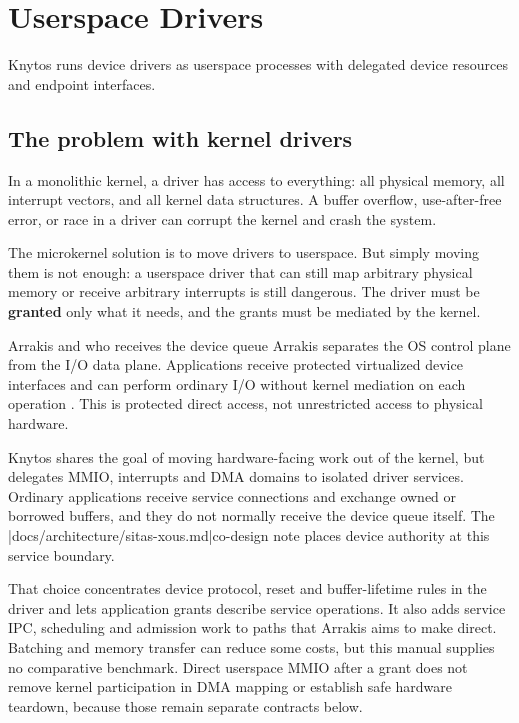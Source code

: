 \chapter{Userspace Drivers}
\label{chap:userspace-drivers}

Knytos runs device drivers as userspace processes with delegated device
resources and endpoint interfaces.

\section{The problem with kernel drivers}

In a monolithic kernel, a driver has access to everything: all physical memory,
all interrupt vectors, and all kernel data structures. A buffer overflow,
use-after-free error, or race in a driver can corrupt the kernel and crash the
system.

The microkernel solution is to move drivers to userspace. But simply moving
them is not enough: a userspace driver that can still map arbitrary physical
memory or receive arbitrary interrupts is still dangerous. The driver must be
\textbf{granted} only what it needs, and the grants must be mediated by the
kernel.

\begin{architecturalcomparison}{Arrakis and who receives the device queue}
Arrakis separates the OS control plane from the I/O data plane. Applications
receive protected virtualized device interfaces and can perform ordinary I/O
without kernel mediation on each operation \cite{prior:arrakis}. This is
protected direct access, not unrestricted access to physical hardware.

Knytos shares the goal of moving hardware-facing work out of the kernel,
but delegates MMIO, interrupts and DMA domains to isolated driver services.
Ordinary applications receive service connections and exchange owned or
borrowed buffers, and they do not normally receive the device queue itself. The
\repofiletext|docs/architecture/sitas-xous.md|{co-design note} places device
authority at this service boundary.

That choice concentrates device protocol, reset and buffer-lifetime rules in
the driver and lets application grants describe service operations. It also
adds service IPC, scheduling and admission work to paths that Arrakis aims to
make direct. Batching and memory transfer can reduce some costs, but this
manual supplies no comparative benchmark. Direct userspace MMIO after a grant
does not remove kernel participation in DMA mapping or establish safe hardware
teardown, because those remain separate contracts below.
\end{architecturalcomparison}

